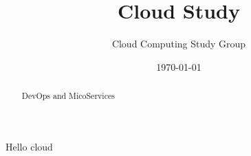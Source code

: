 \documentclass[11pt,a4paper]{article}
\title{Cloud Study}
\author{Cloud Computing Study Group}
\date{\today}
\begin{document}
\begin{abstract}
DevOps and MicoServices
\end{abstract}
\maketitle
Hello cloud \cite{CloudStudy}








\end{document}
